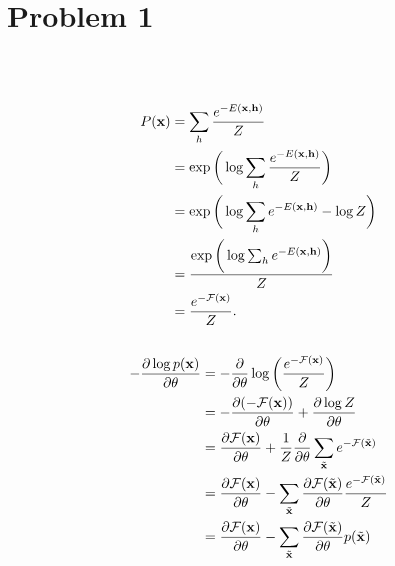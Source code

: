 \section{Problem 1}~\label{sec:prob1}

\subsection{} %

\begin{equation}
\begin{split}
    P({\mathbf{x}})
        &= \sum_h \frac{e^{-E({\mathbf{x}},{\mathbf{h}})}}{Z} \\
        &= \exp\bigg(\log\sum_h\frac{e^{-E({\mathbf{x}},{\mathbf{h}})}}{Z}\bigg) \\
        &= \exp\bigg(\log\sum_h e^{-E({\mathbf{x}},{\mathbf{h}})} - \log Z\bigg) \\
        &= \frac{\exp\bigg(\log\sum_h e^{-E({\mathbf{x}},{\mathbf{h}})}\bigg)}{Z} \\
        &= \frac{e^{-{\mathcal{F}}({\mathbf{x}})}}{Z}. \\
\end{split}
\end{equation}

\subsection{} %

\begin{equation}
\begin{split}
    -\frac{\partial\log p({\mathbf{x}})}{\partial\theta}
        &= -\frac{\partial}{\partial\theta}\log\bigg(\frac{e^{-{\mathcal{F}}({\mathbf{x}})}}{Z}\bigg) \\
        &= -\frac{\partial(-{\mathcal{F}}({\mathbf{x}}))}{\partial\theta} + \frac{\partial \log Z}{\partial\theta} \\
        &= \frac{\partial {\mathcal{F}}({\mathbf{x}})}{\partial\theta} + \frac{1}{Z}\frac{\partial}{\partial\theta} \sum_{\tilde{{\mathbf{x}}}} e^{-{\mathcal{F}}(\tilde{{\mathbf{x}}})}\\
        &= \frac{\partial {\mathcal{F}}({\mathbf{x}})}{\partial\theta} - \sum_{\tilde{{\mathbf{x}}}} \frac{\partial{\mathcal{F}}(\tilde{{\mathbf{x}}})}{\partial\theta}\frac{e^{-{\mathcal{F}}(\tilde{{\mathbf{x}}})}}{Z}\\
        &= \frac{\partial {\mathcal{F}}({\mathbf{x}})}{\partial\theta} - \sum_{\tilde{{\mathbf{x}}}} \frac{\partial{\mathcal{F}}(\tilde{{\mathbf{x}}})}{\partial\theta}p(\tilde{{\mathbf{x}}})\\
\end{split}
\end{equation}

\subsection{} %

